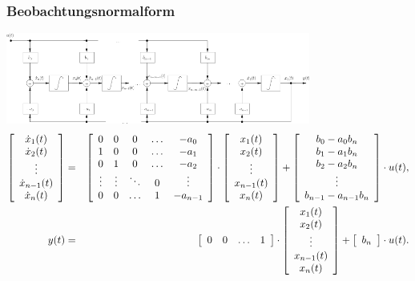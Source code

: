 \subsubsection{Beobachtungsnormalform }
\includegraphics[width=10cm]{./bilder/zrd-beobachtungsnormalform.png} \\
\scriptsize
\begin{eqnarray*}
\left [ 
\begin{array}{c}
\dot{x}_1(t)\\
\dot{x}_2(t)\\
\vdots\\
\dot{x}_{n-1}(t)\\
\dot{x}_n(t)\\
\end{array}
\right ] &=&
\left [ 
\begin{array}{c c c c c}
0 & 0 & 0 & \ldots & -a_0\\
1 & 0 & 0 & \ldots & -a_1\\
0 & 1 & 0 & \ldots & -a_2\\
\vdots & \vdots &  \ddots & 0 & \vdots\\
0 & 0 & \ldots & 1 & -a_{n-1}\\

\end{array}
\right ]\cdot
\left [ 
\begin{array}{c}
x_1(t)\\
x_2(t)\\
\vdots \\
x_{n-1}(t)\\
x_{n}(t)\\
\end{array}
\right ]+
\left [ 
\begin{array}{c}
b_0-a_0b_n \\
b_1-a_1b_n\\
b_2-a_2b_n\\
\vdots\\
b_{n-1}-a_{n-1}b_n\\
\end{array}
\right ]\cdot
u(t),\\
y(t) &= &
\left [ 
\begin{array}{c c c c}
0 & 0 & \ldots & 1\\
\end{array}
\right ] \cdot
\left [ 
\begin{array}{c}
x_1(t)\\
x_2(t)\\
\vdots \\
x_{n-1}(t)\\
x_{n}(t)\\
\end{array}
\right ]+
\left [ 
\begin{array}{c}
b_n \\
\end{array}
\right ] \cdot
u(t).
\end{eqnarray*}
\normalsize
